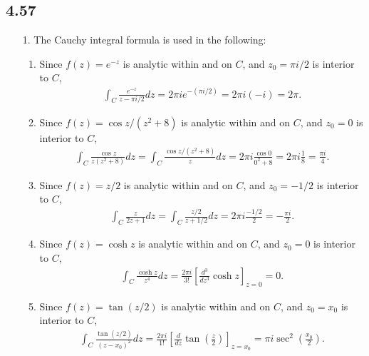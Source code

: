 \documentclass[a4paper,12pt]{article}
\begin{document}
\subsection*{4.57}
\begin{enumerate}
    \item[1.]
        The Cauchy integral formula is used in the following:
        \begin{enumerate}
            \item
                Since $f(z) = e^{-z}$ is analytic within and on $C$, and $z_0 = \pi i/2$ is interior to $C$,
                \begin{align*}
                    \int_C \frac{e^{-z}}{z - \pi i/2} dz = 2\pi i e^{-(\pi i/2)} = 2\pi i(-i) = 2\pi.
                \end{align*}

            \item
                Since $f(z) = \cos z / (z^2 + 8)$ is analytic within and on $C$, and $z_0 = 0$ is interior to $C$,
                \begin{align*}
                    \int_C \frac{\cos z}{z(z^2 + 8)} dz = \int_C \frac{\cos z / (z^2 + 8)}{z} dz = 2\pi i \frac{\cos 0}{0^2 + 8} = 2\pi i \frac{1}{8} = \frac{\pi i}{4}.
                \end{align*}

            \item
                Since $f(z) = z/2$ is analytic within and on $C$, and $z_0 = -1/2$ is interior to $C$,
                \begin{align*}
                    \int_C \frac{z}{2z + 1} dz = \int_C \frac{z/2}{z + 1/2} dz = 2\pi i \frac{-1/2}{2} = -\frac{\pi i}{2}.
                \end{align*}

            \item
                Since $f(z) = \cosh z$ is analytic within and on $C$, and $z_0 = 0$ is interior to $C$,
                \begin{align*}
                    \int_C \frac{\cosh z}{z^4} dz = \frac{2\pi i}{3!} \left[ \frac{d^3}{dz^3} \cosh z \right]_{z = 0} = 0.
                \end{align*}

            \item
                Since $f(z) = \tan(z/2)$ is analytic within and on $C$, and $z_0 = x_0$ is interior to $C$,
                \begin{align*}
                    \int_C \frac{\tan(z/2)}{(z - x_0)^2} dz = \frac{2\pi i}{1!} \left[ \frac{d}{dz} \tan \left( \frac{z}{2} \right) \right]_{z = x_0} = \pi i \sec^2 \left( \frac{x_0}{2} \right).
                \end{align*}
        \end{enumerate}


\end{enumerate}
\end{document}
